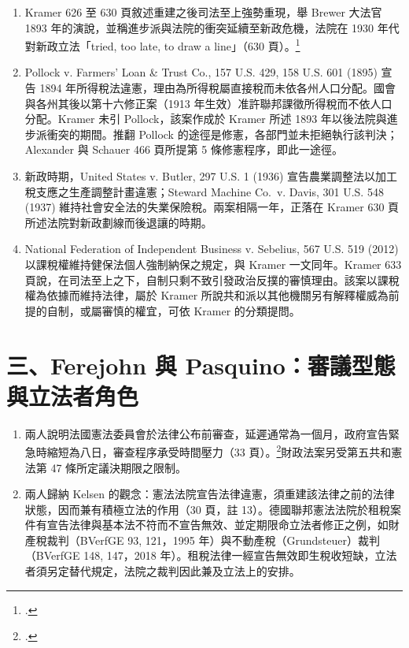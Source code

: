 \begin{enumerate}
\tightlist
\item
  Kramer 626 至 630 頁敘述重建之後司法至上強勢重現，舉 Brewer 大法官 1893 年的演說，並稱進步派與法院的衝突延續至新政危機，法院在 1930 年代對新政立法「tried, too late, to draw a line」（630 頁）。\footcite[626--630]{kramer2012}
\item
  Pollock v. Farmers' Loan \& Trust Co., 157 U.S. 429, 158 U.S. 601 (1895) 宣告 1894 年所得稅法違憲，理由為所得稅屬直接稅而未依各州人口分配。國會與各州其後以第十六修正案（1913 年生效）准許聯邦課徵所得稅而不依人口分配。Kramer 未引 Pollock，該案作成於 Kramer 所述 1893 年以後法院與進步派衝突的期間。推翻 Pollock 的途徑是修憲，各部門並未拒絕執行該判決；Alexander 與 Schauer 466 頁所提第 5 條修憲程序，即此一途徑。
\item
  新政時期，United States v. Butler, 297 U.S. 1 (1936) 宣告農業調整法以加工稅支應之生產調整計畫違憲；Steward Machine Co.~v. Davis, 301 U.S. 548 (1937) 維持社會安全法的失業保險稅。兩案相隔一年，正落在 Kramer 630 頁所述法院對新政劃線而後退讓的時期。
\item
  National Federation of Independent Business v. Sebelius, 567 U.S. 519 (2012) 以課稅權維持健保法個人強制納保之規定，與 Kramer 一文同年。Kramer 633 頁說，在司法至上之下，自制只剩不致引發政治反撲的審慎理由。該案以課稅權為依據而維持法律，屬於 Kramer 所說共和派以其他機關另有解釋權威為前提的自制，或屬審慎的權宜，可依 Kramer 的分類提問。
\end{enumerate}

\section{三、Ferejohn 與 Pasquino：審議型態與立法者角色}
\label{sec:55_fiscal-3}

\begin{enumerate}
\tightlist
\item
  兩人說明法國憲法委員會於法律公布前審查，延遲通常為一個月，政府宣告緊急時縮短為八日，審查程序承受時間壓力（33 頁）。\footcite[33]{ferejohn2002}財政法案另受第五共和憲法第 47 條所定議決期限之限制。
\item
  兩人歸納 Kelsen 的觀念：憲法法院宣告法律違憲，須重建該法律之前的法律狀態，因而兼有積極立法的作用（30 頁，註 13）。德國聯邦憲法法院於租稅案件有宣告法律與基本法不符而不宣告無效、並定期限命立法者修正之例，如財產稅裁判（BVerfGE 93, 121，1995 年）與不動產稅（Grundsteuer）裁判（BVerfGE 148, 147，2018 年）。租稅法律一經宣告無效即生稅收短缺，立法者須另定替代規定，法院之裁判因此兼及立法上的安排。
\end{enumerate}
